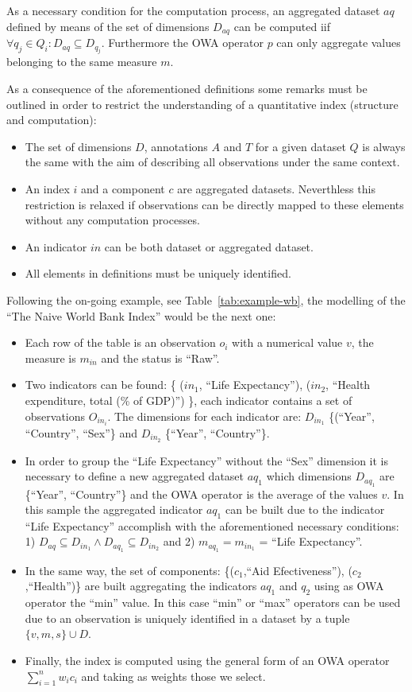 \documentclass{llncs}
\begin{document}
As a necessary condition for the computation process, an aggregated dataset $aq$ defined by means of the set of dimensions $D_{aq}$ can be computed iif 
$\forall q_j \in Q_i: D_{aq} \subseteq D_{q_j}$. Furthermore the OWA operator $p$ can only aggregate values belonging to the same measure $m$.


As a consequence of the aforementioned definitions some remarks must be outlined in order to restrict the understanding of 
a quantitative index (structure and computation):
\begin{itemize}
 \item The set of dimensions $D$, annotations $A$ and $T$ for a given dataset $Q$ is always the same with the aim of describing all observations under 
 the same context.
 \item An index $i$ and a component $c$ are aggregated datasets. Neverthless this restriction is relaxed if observations can be directly mapped to 
 these elements without any computation processes.
 \item An indicator $in$ can be both dataset or aggregated dataset.
 \item All elements in definitions must be uniquely identified. 
\end{itemize}

Following the on-going example, see Table~\ref{tab:example-wb}, the modelling of the ``The Naive World Bank Index'' would be the next one:
\begin{itemize}
 \item Each row of the table is an observation $o_i$ with a numerical value $v$, the measure is $m_{in}$ and the status is ``Raw''.
 \item Two indicators can be found: \{ ($in_1$, ``Life Expectancy''), ($in_2$, ``Health expenditure, total (\% of GDP)'') \}, each indicator contains a set 
 of observations $O_{in_i}$. The dimensions for each indicator are: $D_{in_1}$  \{(``Year'', ``Country'', ``Sex''\} and $D_{in_2}$ \{``Year'', ``Country''\}.
 \item In order to group the ``Life Expectancy'' without the ``Sex'' dimension it is necessary to define a new aggregated dataset $aq_1$ which 
 dimensions $D_{aq_1}$ are \{``Year'', ``Country''\} and the OWA operator is the average of the values $v$. In this sample the aggregated indicator $aq_1$
 can be built due to the indicator ``Life Expectancy'' accomplish with the aforementioned necessary conditions: 1) $D_{aq} \subseteq D_{in_1} \wedge D_{aq_1} \subseteq D_{in_2}$ and 
 2) $m_{aq_1}= m_{in_1}$ = ``Life Expectancy''.
 \item In the same way, the set of components: \{($c_1$,``Aid Efectiveness''), ($c_2$,``Health'')\} are built aggregating the indicators $aq_1$ and 
 $q_2$ using as OWA operator the ``min'' value. In this case ``min'' or ``max'' operators can be used due to an observation is uniquely identified in a 
 dataset by a tuple $\{v,m,s\} \cup D$.
 \item Finally, the index is computed using the general form of an OWA operator $\sum_{i=1}^n  w_i c_i$ and taking as weights those we select.
\end{itemize}
\end{document}
